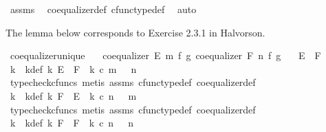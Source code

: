 \begin{isabellebody}
\ assms\ \isamarkupfalse%
\ coequalizer{\isacharunderscore}{\kern0pt}def\ cfunc{\isacharunderscore}{\kern0pt}type{\isacharunderscore}{\kern0pt}def\ \isamarkupfalse%
\ auto%
\endisatagproof
{\isafoldproof}%
%
\isadelimproof
%
\endisadelimproof
%
\begin{isamarkuptext}%
The lemma below corresponds to Exercise 2.3.1 in Halvorson.%
\end{isamarkuptext}\isamarkuptrue%
\isamarkupfalse%
\ coequalizer{\isacharunderscore}{\kern0pt}unique{\isacharcolon}{\kern0pt}\isanewline
\ \ \ {\isachardoublequoteopen}coequalizer\ E\ m\ f\ g{\isachardoublequoteclose}\ {\isachardoublequoteopen}coequalizer\ F\ n\ f\ g{\isachardoublequoteclose}\isanewline
\ \ \ {\isachardoublequoteopen}E\ {\isasymcong}\ F{\isachardoublequoteclose}\isanewline
%
\isadelimproof
%
\endisadelimproof
%
\isatagproof
{}\isamarkupfalse%
\ {\isacharminus}{\kern0pt}\ \isanewline
\ \ \isamarkupfalse%
\ k\ \ k{\isacharunderscore}{\kern0pt}def{\isacharcolon}{\kern0pt}\ {\isachardoublequoteopen}k{\isacharcolon}{\kern0pt}\ E\ {\isasymrightarrow}\ F\ {\isasymand}\ k\ {\isasymcirc}\isactrlsub c\ m\ {\isacharequal}{\kern0pt}\ \ n{\isachardoublequoteclose}\isanewline
\ \ \ \ \ \isamarkupfalse%
\ {\isacharparenleft}{\kern0pt}typecheck{\isacharunderscore}{\kern0pt}cfuncs{\isacharcomma}{\kern0pt}\ metis\ assms\ cfunc{\isacharunderscore}{\kern0pt}type{\isacharunderscore}{\kern0pt}def\ coequalizer{\isacharunderscore}{\kern0pt}def{\isacharparenright}{\kern0pt}\isanewline
\ \ \isamarkupfalse%
\ k{\isacharprime}{\kern0pt}\ \ k{\isacharprime}{\kern0pt}{\isacharunderscore}{\kern0pt}def{\isacharcolon}{\kern0pt}\ {\isachardoublequoteopen}k{\isacharprime}{\kern0pt}{\isacharcolon}{\kern0pt}\ F\ {\isasymrightarrow}\ E\ {\isasymand}\ k{\isacharprime}{\kern0pt}\ {\isasymcirc}\isactrlsub c\ n\ {\isacharequal}{\kern0pt}\ \ m{\isachardoublequoteclose}\isanewline
\ \ \ \ \ \isamarkupfalse%
\ {\isacharparenleft}{\kern0pt}typecheck{\isacharunderscore}{\kern0pt}cfuncs{\isacharcomma}{\kern0pt}\ metis\ assms\ cfunc{\isacharunderscore}{\kern0pt}type{\isacharunderscore}{\kern0pt}def\ coequalizer{\isacharunderscore}{\kern0pt}def{\isacharparenright}{\kern0pt}\isanewline
\ \ \isamarkupfalse%
\ k{\isacharprime}{\kern0pt}{\isacharprime}{\kern0pt}\ \ k{\isacharprime}{\kern0pt}{\isacharprime}{\kern0pt}{\isacharunderscore}{\kern0pt}def{\isacharcolon}{\kern0pt}\ {\isachardoublequoteopen}k{\isacharprime}{\kern0pt}{\isacharprime}{\kern0pt}{\isacharcolon}{\kern0pt}\ F\ {\isasymrightarrow}\ F\ {\isasymand}\ k{\isacharprime}{\kern0pt}{\isacharprime}{\kern0pt}\ {\isasymcirc}\isactrlsub c\ n\ {\isacharequal}{\kern0pt}\ \ n{\isachardoublequoteclose}\isanewline

\end{isabellebody}
